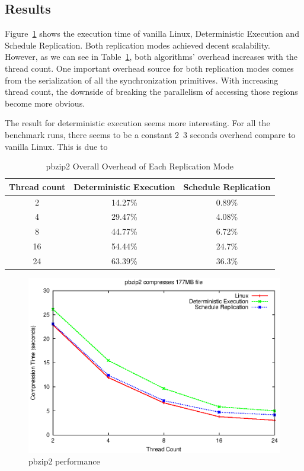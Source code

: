 \subsection{Results}

Figure~\ref{f:pbzip_b10_performance} shows the execution time of vanilla Linux, Deterministic Execution and Schedule Replication. Both replication modes achieved decent scalability. However, as we can see in Table~\ref{t:pbzip2_overall}, both algorithms' overhead increases with the thread count. One important overhead source for both replication modes comes from the serialization of all the synchronization primitives. With increasing thread count, the downside of breaking the parallelism of accessing those regions become more obvious. 

The result for deterministic execution seems more interesting. For all the benchmark runs, there seems to be a constant 2~3 seconds overhead compare to vanilla Linux. This is due to 


\begin{table}
\caption{pbzip2 Overall Overhead of Each Replication Mode}
\begin{center}
 \begin{tabular}{c | c | c}
Thread count & Deterministic Execution & Schedule Replication \\ \hline
 2 & 14.27\% & 0.89\% \\ \hline
 4 & 29.47\% & 4.08\% \\ \hline
 8 & 44.77\% & 6.72\% \\ \hline
 16 & 54.44\% & 24.7\% \\ \hline
 24 & 63.39\% & 36.3\% \\ \hline 
 \end{tabular}
\end{center}
\label{t:pbzip2_overall}
\end{table}

\begin{figure}
\centering
\includegraphics[width=0.8\columnwidth]{figures/pbzip2_b10}
\caption{pbzip2 performance}
\label{f:pbzip_b10_performance}
\end{figure}

